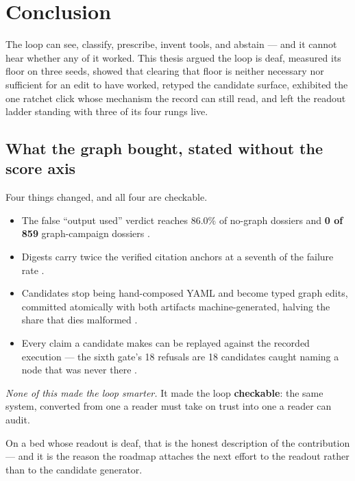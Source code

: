 \chapter{Conclusion}
\label{ch:conclusion}

The loop can see, classify, prescribe, invent tools, and abstain --- and it
cannot hear whether any of it worked. This thesis argued the loop is deaf,
measured its floor on three seeds, showed that clearing that
floor is neither necessary nor sufficient for an edit to have worked,
retyped the candidate surface, exhibited the one ratchet click whose
mechanism the record can still read, and left the readout ladder standing
with three of its four rungs live.

\section*{What the graph bought, stated without the score axis}

Four things changed, and all four are checkable.

\begin{itemize}
  \item The false ``output used'' verdict reaches $86.0\%$ of no-graph
        dossiers and \textbf{0 of 859} graph-campaign dossiers
        .
  \item Digests carry twice the verified citation anchors at a seventh of
        the failure rate .
  \item Candidates stop being hand-composed YAML and become typed graph
        edits, committed atomically with both artifacts machine-generated,
        halving the share that dies malformed .
  \item Every claim a candidate makes can be replayed against the recorded
        execution --- the sixth gate's 18 refusals are 18 candidates caught
        naming a node that was never there .
\end{itemize}

\emph{None of this made the loop smarter.} It made the loop
\textbf{checkable}: the same system, converted from one a reader must take
on trust into one a reader can audit.

On a bed whose readout is deaf, that is the honest description of the
contribution --- and it is the reason the roadmap attaches the next effort
to the readout rather than to the candidate generator.

